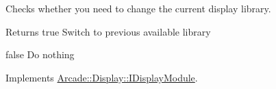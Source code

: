 Checks whether you need to change the current display library. 

\begin{DoxyReturn}{Returns}
true Switch to previous available library 

false Do nothing 
\end{DoxyReturn}


Implements \mbox{\hyperlink{classArcade_1_1Display_1_1IDisplayModule_a498d51597164e9f92e97ec2afee426b0}{Arcade\+::\+Display\+::\+I\+Display\+Module}}.

